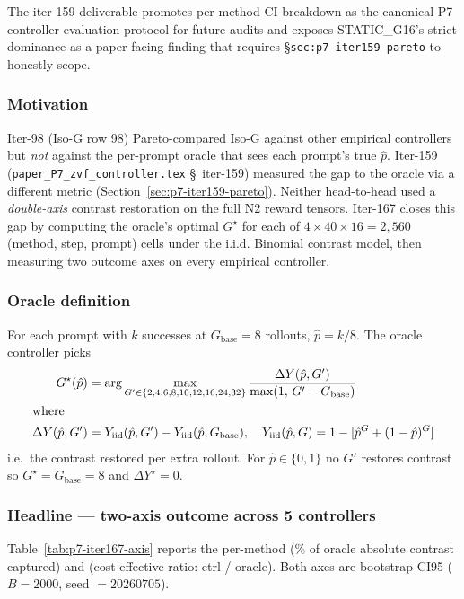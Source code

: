 \documentclass{article}
\begin{document}
The iter-159 deliverable promotes per-method CI breakdown as the canonical
P7 controller evaluation protocol for future audits and exposes STATIC\_G16's
strict dominance as a paper-facing finding that requires §\texttt{sec:p7-iter159-pareto}
to honestly scope. 

\subsubsection*{Motivation}

Iter-98 (Iso-G row 98) Pareto-compared Iso-G against other empirical
controllers but \emph{not} against the per-prompt oracle that sees each
prompt's true $\hat p$. Iter-159 (\texttt{paper\_P7\_zvf\_controller.tex}
\S~iter-159) measured the gap to the oracle via a different metric
(Section~\ref{sec:p7-iter159-pareto}). Neither head-to-head used a
\emph{double-axis} contrast restoration on the full N2 reward tensors.
Iter-167 closes this gap by computing the oracle's optimal $G^\star$ for
each of $4 \times 40 \times 16 = 2{,}560$ (method, step, prompt) cells
under the i.i.d. Binomial contrast model, then measuring two outcome axes
on every empirical controller.

\subsubsection*{Oracle definition}

For each prompt with $k$ successes at $G_{\mathrm{base}}=8$ rollouts,
$\hat p = k / 8$. The oracle controller picks
\begin{align}
G^\star(\hat p)
  &= \arg\max_{G' \in \{2,4,6,8,10,12,16,24,32\}}
     \frac{\Delta Y(\hat p, G')}{\max(1,\, G' - G_{\mathrm{base}})} \label{eq:iter167-oracle}\\
\intertext{where}
\Delta Y(\hat p, G')
  &= Y_{\mathrm{iid}}(\hat p, G') - Y_{\mathrm{iid}}(\hat p, G_{\mathrm{base}}), \quad
Y_{\mathrm{iid}}(\hat p, G) = 1 - [\hat p^G + (1-\hat p)^G] \nonumber
\end{align}
i.e.\ the contrast restored per extra rollout. For $\hat p \in \{0, 1\}$ no
$G'$ restores contrast so $G^\star = G_{\mathrm{base}} = 8$ and
$\Delta Y^\star = 0$.

\subsubsection*{Headline --- two-axis outcome across 5 controllers}

Table~\ref{tab:p7-iter167-axis} reports the per-method (\% of oracle
absolute contrast captured) and (cost-effective ratio: ctrl / oracle).
Both axes are bootstrap CI95 ($B = 2000$, seed $= 20260705$).
\end{document}
